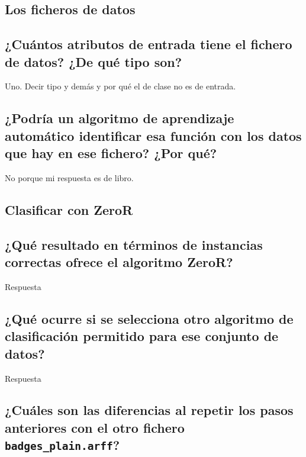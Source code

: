 \documentclass[12pt]{article}
\begin{document}
\tableofcontents

\newpage

\begin{center}
\section{Los ficheros de datos}
\end{center}

\subsection{\small ¿Cuántos atributos de entrada tiene el fichero de datos?
¿De qué tipo son?}

Uno. Decir tipo y demás y por qué el de clase no es de entrada.

\subsection{\small ¿Podría un algoritmo de aprendizaje automático identificar esa
función con los datos que hay en ese fichero? ¿Por qué?}

No porque mi respuesta es de libro.

\newpage

\begin{center}
\section{Clasificar con ZeroR}
\end{center}

\subsection{\small ¿Qué resultado en términos de instancias correctas ofrece el algoritmo
ZeroR?}

Respuesta

\subsection{\small ¿Qué ocurre si se selecciona otro algoritmo de clasificación permitido
para ese conjunto de datos?}

Respuesta

\subsection{\small ¿Cuáles son las diferencias al repetir los pasos anteriores con el otro
fichero \texttt{badges\_plain.arff}?}
\end{document}
